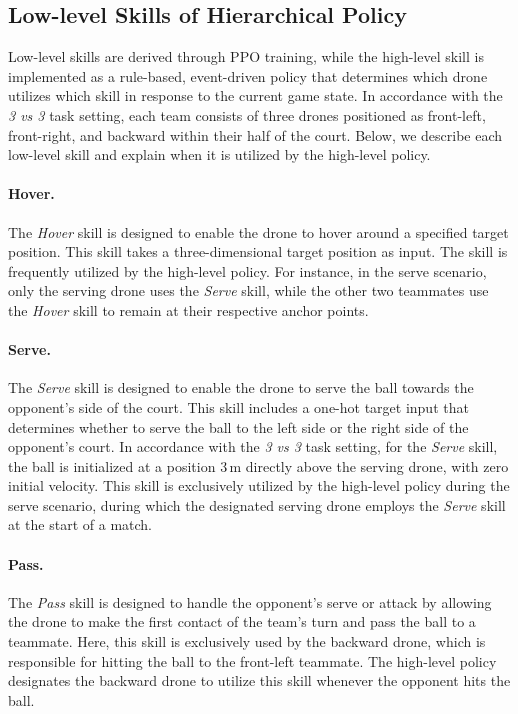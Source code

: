 \subsection{Low-level Skills of Hierarchical Policy}
\label{app:low}

Low-level skills are derived through PPO training, while the high-level skill is implemented as a rule-based, event-driven policy that determines which drone utilizes which skill in response to the current game state. In accordance with the \textit{3 vs 3} task setting, each team consists of three drones positioned as front-left, front-right, and backward within their half of the court. Below, we describe each low-level skill and explain when it is utilized by the high-level policy. 

\paragraph{Hover.}
The \textit{Hover} skill is designed to enable the drone to hover around a specified target position. This skill takes a three-dimensional target position as input. The skill is frequently utilized by the high-level policy. For instance, in the serve scenario, only the serving drone uses the \textit{Serve} skill, while the other two teammates use the \textit{Hover} skill to remain at their respective anchor points.

\paragraph{Serve.}
The \textit{Serve} skill is designed to enable the drone to serve the ball towards the opponent’s side of the court. This skill includes a one-hot target input that determines whether to serve the ball to the left side or the right side of the opponent’s court.
In accordance with the \textit{3 vs 3} task setting, for the \textit{Serve} skill, the ball is initialized at a position $3\,\mathrm{m}$ directly above the serving drone, with zero initial velocity. 
This skill is exclusively utilized by the high-level policy during the serve scenario, during which the designated serving drone employs the \textit{Serve} skill at the start of a match.

\paragraph{Pass.}
The \textit{Pass} skill is designed to handle the opponent’s serve or attack by allowing the drone to make the first contact of the team’s turn and pass the ball to a teammate. Here, this skill is exclusively used by the backward drone, which is responsible for hitting the ball to the front-left teammate. The high-level policy designates the backward drone to utilize this skill whenever the opponent hits the ball.


